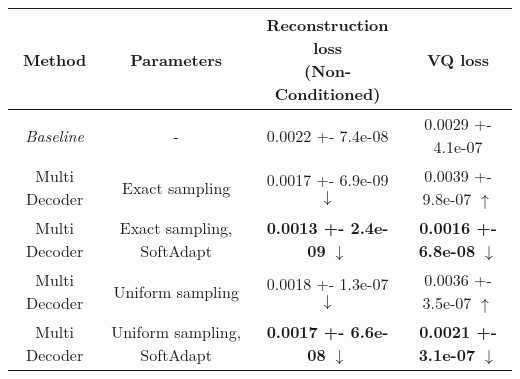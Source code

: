\centering
\scriptsize
\begin{tabular}{||c|c|c|c||}
\hline
 Method & Parameters & \shortstack{Reconstruction loss \\  (Non-Conditioned)} & VQ loss \\
\hline
\textit{Baseline} & - & 0.0022 +- 7.4e-08 & 0.0029 +- 4.1e-07 \\
\hline
Multi Decoder & Exact sampling & 0.0017 +- 6.9e-09  $\downarrow$ & 0.0039 +- 9.8e-07  $\uparrow$ \\
\hline
Multi Decoder & Exact sampling, SoftAdapt & \textbf{0.0013 +- 2.4e-09}  $\downarrow$ & \textbf{0.0016 +- 6.8e-08}  $\downarrow$ \\
\hline
Multi Decoder & Uniform sampling & 0.0018 +- 1.3e-07  $\downarrow$ & 0.0036 +- 3.5e-07  $\uparrow$ \\
\hline
Multi Decoder & Uniform sampling, SoftAdapt & \textbf{0.0017 +- 6.6e-08}  $\downarrow$ & \textbf{0.0021 +- 3.1e-07}  $\downarrow$ \\
\hline
\end{tabular}
